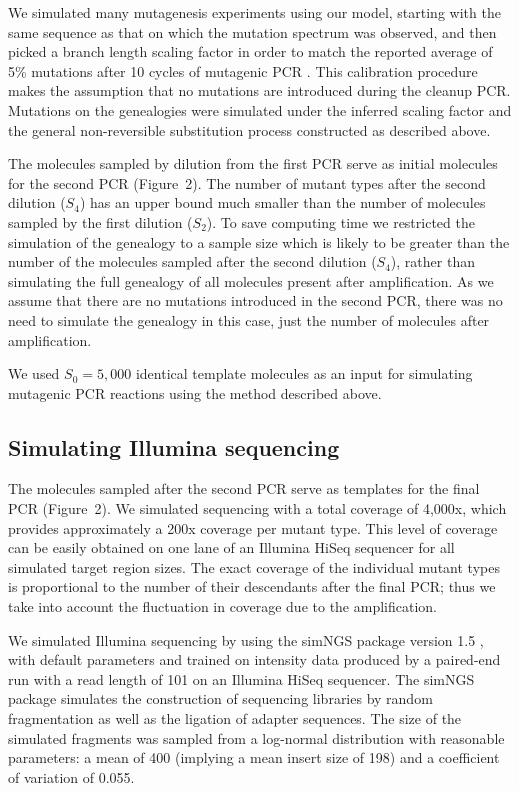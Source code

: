 \documentclass[10pt]{article}
\begin{document}
We simulated many mutagenesis experiments using our model, starting with the same sequence as that on which the mutation spectrum was observed, and then picked a branch length scaling factor in order to match the reported average of 5\% mutations after 10 cycles of mutagenic PCR \cite{Zaccolo1996}. This calibration procedure makes the assumption that no mutations are introduced during the cleanup PCR. 
Mutations on the genealogies were simulated under the inferred scaling factor and the general non-reversible substitution process constructed as described above.

The molecules sampled by dilution from the first PCR serve as initial molecules for the second PCR (Figure~2).
The number of mutant types after the second dilution ($S_4$) has an upper bound much smaller than the number of molecules sampled by the first dilution ($S_2$). To save computing time we restricted the simulation of the genealogy to a sample size which is likely to be greater than the number of the molecules sampled after the second dilution ($S_4$), rather than simulating the full genealogy of all molecules present after amplification. As we assume that there are no mutations introduced in the second PCR, there was no need to simulate the genealogy in this case, just the number of molecules after amplification.

We used $S_0 = 5,000$ identical template molecules as an input for simulating mutagenic PCR reactions using the method described above.

\subsection*{Simulating Illumina sequencing}

The molecules sampled after the second PCR serve as templates for the final PCR (Figure~2).
We simulated sequencing with a total coverage of 4,000x, which provides approximately a 200x coverage per mutant type. This level of coverage can be easily obtained on one lane of an Illumina HiSeq sequencer for all simulated target region sizes. The exact coverage of the individual mutant types is proportional to the number of their descendants after the final PCR; thus we take into account the fluctuation in coverage due to the amplification.

We simulated Illumina sequencing by using the simNGS package version 1.5 \cite{simngs}, with default parameters and trained on intensity data produced by a paired-end run with a read length of 101 on an Illumina HiSeq sequencer. The simNGS package simulates the construction of sequencing libraries by random fragmentation as well as the ligation of adapter sequences. The size of the simulated fragments was sampled from a log-normal distribution with reasonable parameters: a mean of 400 (implying a mean insert size of 198) and a coefficient of variation of 0.055.
\end{document}
